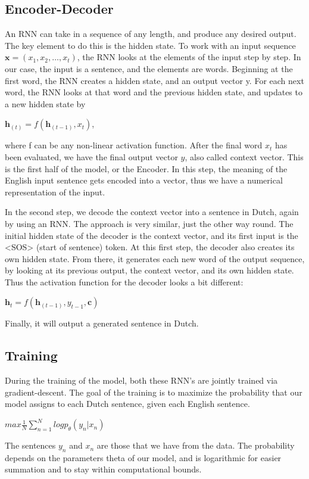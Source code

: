 \documentclass[11pt]{article}
\begin{document}
\subsection{Encoder-Decoder}
An RNN can take in a sequence of any length, and produce any desired output. The key element to do this is the hidden state. To work with an input sequence $\textbf{x} = (x_1,x_2,…,x_t)$, the RNN looks at the elements of the input step by step. In our case, the input is a sentence, and the elements are words. Beginning at the first word, the RNN creates a hidden state, and an output vector y. For each next word, the RNN looks at that word and the previous hidden state, and updates to a new hidden state by
\begin{center}
    $\textbf{h}_{(t)} = f(\textbf{h}_{(t-1)},x_{t})$,
\end{center} 
where f can be any non-linear activation function. After the final word $x_t$ has been evaluated, we have the final output vector $y$, also called context vector. This is the first half of the model, or the Encoder. In this step, the meaning of the English input sentence gets encoded into a vector, thus we have a numerical representation of the input.

In the second step, we decode the context vector into a sentence in Dutch, again by using an RNN. The approach is very similar, just the other way round. The initial hidden state of the decoder is the context vector, and its first input is the <SOS> (start of sentence) token. At this first step, the decoder also creates its own hidden state. From there, it generates each new word of the output sequence, by looking at its previous output, the context vector, and its own hidden state. Thus the activation function for the decoder looks a bit different: 
\begin{center}
    $\textbf{h}_t = f(\textbf{h}_{(t-1)},y_{t-1},\textbf{c})$
\end{center} 
Finally, it will output a generated sentence in Dutch.

\subsection{Training}
During the training of the model, both these RNN’s are jointly trained via gradient-descent. The goal of the training is to maximize the probability that our model assigns to each Dutch sentence, given each English sentence. 
\begin{center}
    $max \frac{1}{N} \sum_{n=1}^{N} logp_{\theta}(y_n|x_n)$
\end{center}
The sentences $y_{n}$ and $x_{n}$ are those that we have from the data. The probability depends on the parameters theta of our model, and is logarithmic for easier summation and to stay within computational bounds.
\end{document}
